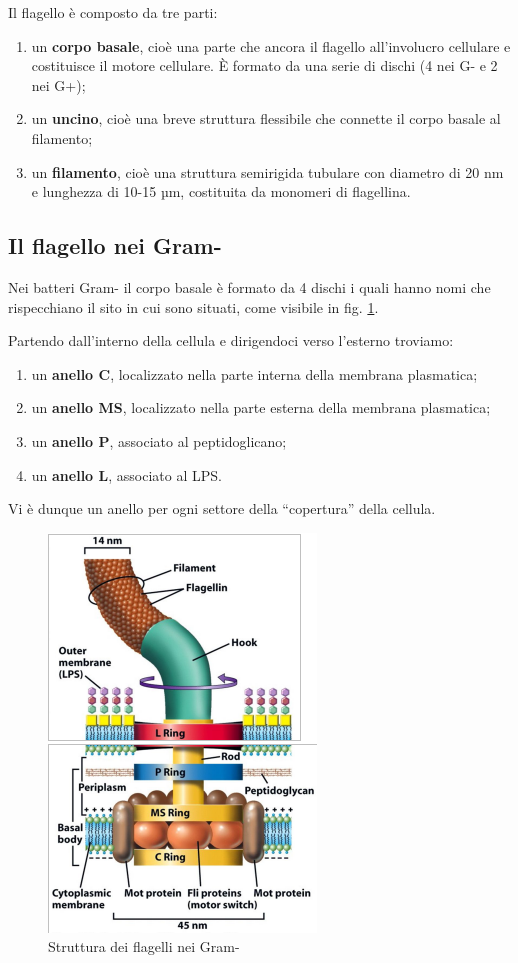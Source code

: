\documentclass[11pt]{book}
\begin{document}
\clearpage
Il flagello è composto da tre parti:
\begin{enumerate}
\item un \textbf{corpo basale}, cioè una parte che ancora il flagello all’involucro cellulare e costituisce il motore cellulare. È formato da una serie di dischi (4 nei G- e 2 nei G+);
\item un \textbf{uncino}, cioè una breve struttura flessibile che connette il corpo basale al filamento;
\item un \textbf{filamento}, cioè una struttura semirigida tubulare con diametro di 20 nm e lunghezza di 10-15 µm, costituita da monomeri di flagellina.
\end{enumerate}

\subsection{Il flagello nei Gram-} 
Nei batteri Gram- il corpo basale è formato da 4 dischi i quali hanno nomi che rispecchiano il sito in cui sono situati, come visibile in fig. \ref{flagelli_gram-}.

Partendo dall’interno della cellula e dirigendoci verso l’esterno troviamo:
\begin{enumerate}
\item un \textbf{anello C}, localizzato nella parte interna della membrana plasmatica;
\item un \textbf{anello MS}, localizzato nella parte esterna della membrana plasmatica;
\item un \textbf{anello P}, associato al peptidoglicano;
\item un \textbf{anello L}, associato al LPS.
\end{enumerate}

Vi è dunque un anello per ogni settore della “copertura” della cellula.

\begin{figure}[htp]
\centering
\includegraphics[scale=0.66]{img/Flagello.png}
\caption{Struttura dei flagelli nei Gram-}
\label{flagelli_gram-}
\end{figure}
\end{document}

